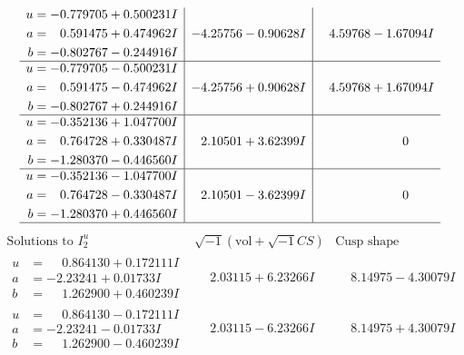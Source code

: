 \documentclass[1p]{elsarticle_modified}
\theoremstyle{definition}
\newcommand{\I}{\sqrt{-1}}
\begin{document}
$$\begin{array}{c|c|c}
\begin{aligned}
u &= -0.779705 + 0.500231 I \\
a &= \phantom{-}0.591475 + 0.474962 I \\
b &= -0.802767 - 0.244916 I\end{aligned}
 & -4.25756 - 0.90628 I & \phantom{-}4.59768 - 1.67094 I \\ \hline\begin{aligned}
u &= -0.779705 - 0.500231 I \\
a &= \phantom{-}0.591475 - 0.474962 I \\
b &= -0.802767 + 0.244916 I\end{aligned}
 & -4.25756 + 0.90628 I & \phantom{-}4.59768 + 1.67094 I \\ \hline\begin{aligned}
u &= -0.352136 + 1.047700 I \\
a &= \phantom{-}0.764728 + 0.330487 I \\
b &= -1.280370 - 0.446560 I\end{aligned}
 & \phantom{-}2.10501 + 3.62399 I & \phantom{-0.000000 } 0 \\ \hline\begin{aligned}
u &= -0.352136 - 1.047700 I \\
a &= \phantom{-}0.764728 - 0.330487 I \\
b &= -1.280370 + 0.446560 I\end{aligned}
 & \phantom{-}2.10501 - 3.62399 I & \phantom{-0.000000 } 0\\
 \hline 
 \end{array}$$\newpage$$\begin{array}{c|c|c}  
\text{Solutions to }I^u_{2}& \I (\text{vol} + \sqrt{-1}CS) & \text{Cusp shape}\\
 \hline 
\begin{aligned}
u &= \phantom{-}0.864130 + 0.172111 I \\
a &= -2.23241 + 0.01733 I \\
b &= \phantom{-}1.262900 + 0.460239 I\end{aligned}
 & \phantom{-}2.03115 + 6.23266 I & \phantom{-}8.14975 - 4.30079 I \\ \hline\begin{aligned}
u &= \phantom{-}0.864130 - 0.172111 I \\
a &= -2.23241 - 0.01733 I \\
b &= \phantom{-}1.262900 - 0.460239 I\end{aligned}
 & \phantom{-}2.03115 - 6.23266 I & \phantom{-}8.14975 + 4.30079 I \\ \hline\begin{aligned}

\end{aligned}
\end{array}$$
\end{document}

